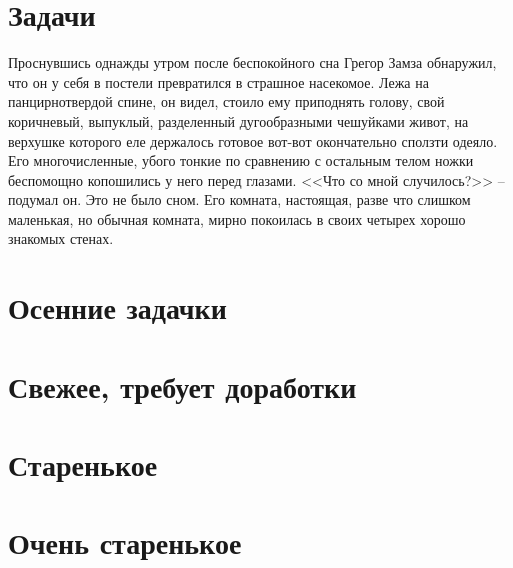 \chapter{Задачи}

Проснувшись однажды утром после беспокойного сна Грегор Замза обнаружил, что
он у себя в постели превратился в страшное насекомое. Лежа на панцирнотвердой
спине, он видел, стоило ему приподнять голову, свой коричневый, выпуклый,
разделенный дугообразными чешуйками живот, на верхушке которого еле держалось
готовое вот-вот окончательно сползти одеяло. Его многочисленные, убого тонкие
по сравнению с остальным телом ножки беспомощно копошились у него перед
глазами. <<Что со мной случилось?>> -- подумал он. Это не было сном. Его комната,
настоящая, разве что слишком маленькая, но обычная комната, мирно покоилась в
своих четырех хорошо знакомых стенах.










\chapter{Осенние задачки}

%
%
%
%
%


\chapter{Свежее, требует доработки} %



%

\chapter{Старенькое} %

%





\chapter{Очень старенькое} %









